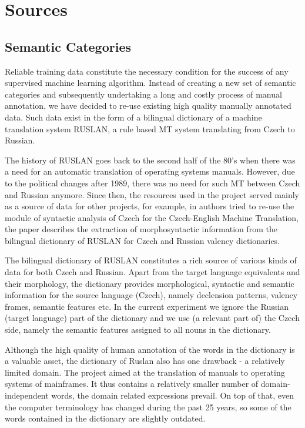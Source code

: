 \documentclass[letterpaper]{article}
\begin{document}
\section{Sources}
\subsection{Semantic Categories}
Reliable training data constitute the necessary condition for the success of any supervised machine learning algorithm. Instead of creating a new set of semantic categories and subsequently undertaking a long and costly process of manual annotation, we have decided to re-use existing high quality manually annotated data. Such data exist in the form of a bilingual dictionary of a machine translation system RUSLAN, a rule based MT system translating from Czech to Russian.

The history of RUSLAN \cite{oliva1989parser} goes back to the second half of the 80's when there was a need for an automatic translation of operating systems manuals. However, due to the political changes after 1989, 
there was no need for such MT between Czech and Russian anymore. Since then, the resources used in the project served mainly as a source of data for other projects, for
example, in \cite{mt-recycled} authors tried to re-use the module
of syntactic analysis of Czech for the Czech-English Machine Translation,
the paper \cite{pisa2010} describes the extraction of morphosyntactic information from the bilingual dictionary of RUSLAN for Czech and Russian valency dictionaries.

The bilingual dictionary of RUSLAN constitutes a rich source of various kinds of data for both Czech and Russian. Apart from the target language equivalents and their morphology, the dictionary provides  morphological, syntactic and semantic information for the source language (Czech), namely declension patterns, valency frames, semantic features etc. In the current experiment we ignore the Russian (target language)
part of the dictionary and we use (a relevant part of) the Czech side, namely the semantic features assigned to all nouns in the dictionary. 

Although the high quality of human annotation of the words in the dictionary is a valuable asset, the dictionary of Ruslan also has one drawback - a relatively limited domain. The project aimed at the translation of manuals to operating systems of mainframes. It thus contains a relatively smaller number of domain-independent words, the domain related expressions prevail. On top of that, even the computer terminology has changed during the past 25 years, so  some of the words contained in the dictionary are slightly outdated. 
\end{document}
